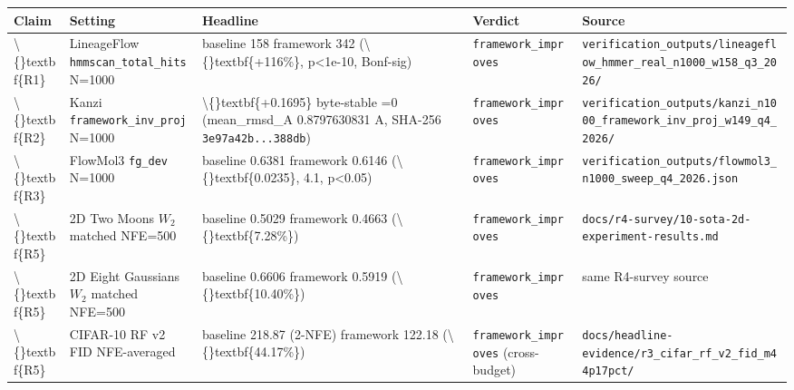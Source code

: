 \documentclass[preprint,3p,times,twocolumn]{elsarticle}
\begin{document}
\begin{table}[ht]
\centering
\small
\begin{tabular}{lllll}
\hline
\textbf{Claim} & \textbf{Setting} & \textbf{Headline} & \textbf{Verdict} & \textbf{Source} \\
\hline
\textbackslash\{\}textbf\{R1\} & LineageFlow \texttt{hmmscan\_total\_hits} N=1000 & baseline 158  framework 342 (\textbackslash\{\}textbf\{+116\%\}, p<1e-10, Bonf-sig) & \texttt{framework\_improves} & \texttt{verification\_outputs/lineageflow\_hmmer\_real\_n1000\_w158\_q3\_2026/} \\
\textbackslash\{\}textbf\{R2\} & Kanzi \texttt{framework\_inv\_proj} N=1000 & \textbackslash\{\}textbf\{+0.1695\} byte-stable =0 (mean\_rmsd\_A 0.8797630831 A, SHA-256 \texttt{3e97a42b...388db}) & \texttt{framework\_improves} & \texttt{verification\_outputs/kanzi\_n1000\_framework\_inv\_proj\_w149\_q4\_2026/} \\
\textbackslash\{\}textbf\{R3\} & FlowMol3 \texttt{fg\_dev} N=1000 & baseline 0.6381  framework 0.6146 (\textbackslash\{\}textbf\{0.0235\}, 4.1, p<0.05) & \texttt{framework\_improves} & \texttt{verification\_outputs/flowmol3\_n1000\_sweep\_q4\_2026.json} \\
\textbackslash\{\}textbf\{R5\} & 2D Two Moons $W_2$ matched NFE=500 & baseline 0.5029  framework 0.4663 (\textbackslash\{\}textbf\{7.28\%\}) & \texttt{framework\_improves} & \texttt{docs/r4-survey/10-sota-2d-experiment-results.md} \\
\textbackslash\{\}textbf\{R5\} & 2D Eight Gaussians $W_2$ matched NFE=500 & baseline 0.6606  framework 0.5919 (\textbackslash\{\}textbf\{10.40\%\}) & \texttt{framework\_improves} & same R4-survey source \\
\textbackslash\{\}textbf\{R5\} & CIFAR-10 RF v2 FID NFE-averaged & baseline 218.87 (2-NFE)  framework 122.18 (\textbackslash\{\}textbf\{44.17\%\}) & \texttt{framework\_improves} (cross-budget) & \texttt{docs/headline-evidence/r3\_cifar\_rf\_v2\_fid\_m44p17pct/} \\
\hline
\end{tabular}
\end{table}
\end{document}
